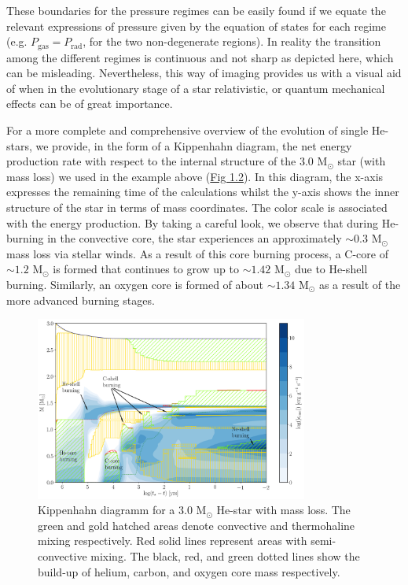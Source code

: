 \documentclass[../../main/thesis_msc.tex]{subfiles}
\begin{document}
				These boundaries for the pressure regimes can be easily found if we equate the relevant expressions of pressure given by the equation of states for each regime (e.g. $P_{\text{gas}} = P_{\text{rad}}$, for the two non-degenerate regions). In reality the transition among the different regimes is continuous and not sharp as depicted here, which can be misleading. Nevertheless, this way of imaging provides us with a visual aid of when in the evolutionary stage of a star relativistic, or quantum mechanical effects can be of great importance.
				
				
				For a more complete and comprehensive overview of the evolution of single He-stars, we provide, in the form of a Kippenhahn diagram, the net energy production rate with respect to the internal structure of the $3.0$ M$_{\odot}$ star (with mass loss) we used in the example above (\hyperref[fig:Kipp_3p0_ch1]{Fig 1.2}). In this diagram, the x-axis expresses the remaining time of the calculations whilst the y-axis shows the inner structure of the star in terms of mass coordinates. The color scale is associated with the energy production. By taking a careful look, we observe that during He-burning in the convective core, the star experiences an approximately $\sim 0.3$ M$_{\odot}$ mass loss via stellar winds. As a result of this core burning process, a C-core of $\sim 1.2$ M$_{\odot}$ is formed that continues to grow up to $\sim 1.42$ M$_{\odot}$ due to He-shell burning. Similarly, an oxygen core is formed of about $\sim 1.34$ M$_{\odot}$ as a result of the more advanced burning stages.
				
				\begin{figure}[t]
					\centering
					\includegraphics[width=0.8\textwidth]{../figures/chapter1/Kippenhahn_intro.png}
					\caption{Kippenhahn diagramm for a $3.0$ M$_{\odot}$ He-star with mass loss. The green and gold hatched areas denote convective and thermohaline mixing respectively. Red solid lines represent areas with semi-convective mixing. The black, red, and green dotted lines show the build-up of helium, carbon, and oxygen core mass respectively.}
					\label{fig:Kipp_3p0_ch1}
				\end{figure}
\end{document}
